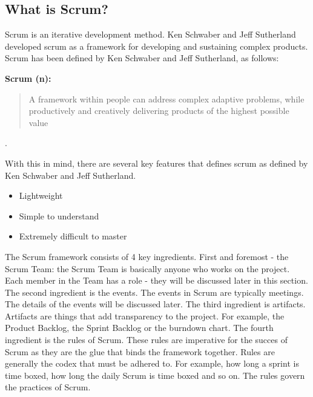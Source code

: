 \subsection{What is Scrum?}


Scrum is an iterative development method\cite{scrumguide11}.
Ken Schwaber and Jeff Sutherland developed scrum as a framework for developing 
and sustaining complex products\cite{scrumguide11}. Scrum has been defined by 
Ken Schwaber and Jeff Sutherland, as follows:


\textbf{Scrum (n):} \begin{quotation}
A framework within people can address complex adaptive 
problems, while productively and creatively delivering products of the highest 
possible value
\end{quotation}\cite{scrumguide11}.

With this in mind, there are several key features that defines 
scrum as defined by Ken Schwaber and Jeff Sutherland\cite{scrumguide11}.

\begin{itemize}
	\item Lightweight
	\item Simple to understand
	\item Extremely difficult to master
\end{itemize}


The Scrum framework consists of 4 key ingredients. First and foremost - the Scrum Team: the 
Scrum Team is basically anyone who works on the project. Each member in the Team has a 
role - they will be discussed later in this section\cite{scrumguide11}.
The second ingredient is the events. The events in Scrum are typically meetings. The 
details of the events will be discussed later. The third ingredient is artifacts. Artifacts 
are things that add transparency to the project. For example, the Product Backlog, the 
Sprint Backlog or the burndown chart\cite{scrumguide11}. The fourth ingredient is the rules 
of Scrum. These rules are imperative for the succes of Scrum as they are the glue that binds 
the framework together. Rules are generally the codex that must be adhered to. For example, 
how long a sprint is time boxed, how long the daily Scrum is time boxed and so on. The rules 
govern the practices of Scrum\cite{scrumguide11}.



